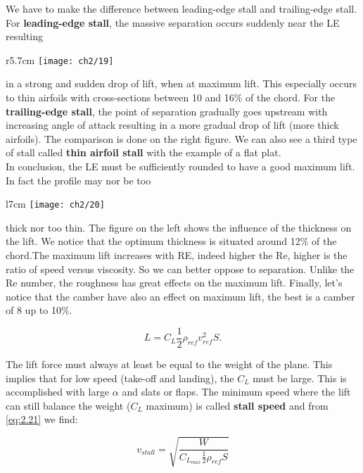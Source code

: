 \documentclass[british,french,11pt, a4paper, openany]{article}
\begin{document}
We have to make the difference between leading-edge stall and trailing-edge stall. For \textbf{leading-edge stall}, the massive separation occurs suddenly near the LE resulting 

\begin{wrapfigure}[13]{r}{5.7cm}
	\vspace{-5mm}
	\texttt{[image: ch2/19]}
\end{wrapfigure}
in a strong and sudden drop of lift, when at maximum lift. This especially occurs to thin airfoils with cross-sections between 10 and 16\% of the chord. For the \textbf{trailing-edge stall}, the point of separation gradually goes upstream with increasing angle of attack resulting in a more gradual drop of lift (more thick airfoils). The comparison is done on the right figure. We can also see a third type of stall called \textbf{thin airfoil stall} with the example of a flat plat.  \\

In conclusion, the LE must be sufficiently rounded to have a good maximum lift. In fact the profile may nor be too 

\begin{wrapfigure}[8]{l}{7cm}
	\vspace{-5mm}
	\texttt{[image: ch2/20]}
\end{wrapfigure}
thick  nor too thin. The figure on the left shows the influence of the thickness on the lift. We notice that the optimum thickness is situated around 12\% of the chord.The maximum lift increases with RE, indeed higher the Re, higher is the ratio of speed versus viscosity. So we can better oppose to separation. Unlike the Re number, the roughness has great effects on the maximum lift. Finally, let's notice that the camber have also an effect on maximum lift, the best is a camber of 8 up to 10\%.

\begin{equation}
L = C_L \frac{1}{2} \rho _{ref} v^2_{ref} S.
\label{eq:2.21}
\end{equation}

The lift force must always at least be equal to the weight of the plane. This implies that for low speed (take-off and landing), the $C_L$ must be large. This is accomplished with large $\alpha$ and slats or flaps. The minimum speed where the lift can still balance the weight ($C_L$ maximum) is called \textbf{stall speed} and from \eqref{eq:2.21} we find:

\begin{equation}
v_{stall} = \sqrt{\frac{W}{C_{L_{max}} \frac{1}{2} \rho_{ref} S}}
\end{equation}
\end{document}
